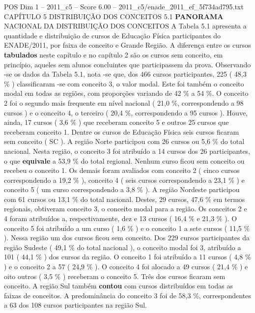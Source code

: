 \begin{textsample}{POS Dim 1 – 2011\_c5 – Score 6.00 – 2011\_c5/enade\_2011\_ef\_5f734ad795.txt}  \label{ex:f1_pos_126}
CAPÍTULO 5 DISTRIBUIÇÃO DOS CONCEITOS 5.1 \textbf{PANORAMA} NACIONAL DA DISTRIBUIÇÃO DOS CONCEITOS A Tabela 5.1 apresenta a quantidade e distribuição de cursos de Educação Física participantes do ENADE/2011, por faixa de conceito e Grande Região.
A diferença entre os cursos \textbf{tabulados} neste capítulo e no capítulo 2 são os cursos sem conceito, em princípio, aqueles sem alunos concluintes que participassem da prova.
Observando -se os dados da Tabela 5.1, nota -se que, dos 466 cursos participantes, 225 ( 48,3 \% ) classificaram -se com conceito 3, o valor modal.
Este foi também o conceito modal em todas as regiões, com proporções variando de 42 \% a 54 \%.
O conceito 2 foi o segundo mais frequente em nível nacional ( 21,0 \%, correspondendo a 98 cursos ) e o conceito 4, o terceiro ( 20,4 \%, correspondendo a 95 cursos ).
Houve, ainda, 17 cursos ( 3,6 \% ) que receberam conceito 5 e outros 25 cursos que receberam conceito 1.
Dentre os cursos de Educação Física seis cursos ficaram sem conceito ( SC ).
A região Norte participou com 26 cursos ou 5,6 \% do total nacional.
Nesta região, o conceito 3 foi atribuído a 14 cursos dos 26 participantes, o que \textbf{equivale} a 53,9 \% do total regional.
Nenhum curso ficou sem conceito ou recebeu o conceito 1.
Os demais foram avaliados com conceito 2 ( cinco cursos correspondendo a 19,2 \% ), conceito 4 ( seis cursos correspondendo a 23,1 \% ) e conceito 5 ( um curso correspondendo a 3,8 \% ).
A região Nordeste participou com 61 cursos ou 13,1 \% do total nacional.
Destes, 29 cursos, 47,6 \% em termos regionais, obtiveram conceito 3, o conceito modal para a região.
Os conceitos 2 e 4 foram atribuídos a, respectivamente, dez e 13 cursos ( 16,4 \% e 21,3 \% ).
O conceito 5 foi atribuído a um curso ( 1,6 \% ) e o conceito 1 a sete cursos ( 11,5 \% ).
Nessa região um dos cursos ficou sem conceito.
Dos 229 cursos participantes da região Sudeste ( 49,1 \% do total nacional ), o conceito modal foi 3, atribuído a 101 ( 44,1 \% ) dos cursos da região.
O conceito 1 foi atribuído a 11 cursos ( 4,8 \% ) e o conceito 2 a 57 ( 24,9 \% ).
O conceito 4 foi alocado a 49 cursos ( 21,4 \% ) e oito outros ( 3,5 \% ) receberam o conceito 5.
Três dos cursos ficaram sem conceito.
A região Sul também \textbf{contou} com cursos distribuídos em todas as faixas de conceitos.
A predominância do conceito 3 foi de 58,3 \%, correspondentes a 63 dos 108 cursos participantes na região Sul.

\end{textsample}
